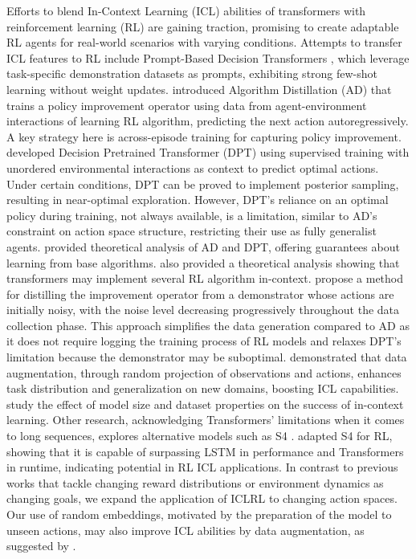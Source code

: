 \documentclass{article}
\theoremstyle{plain}
\theoremstyle{definition}
\theoremstyle{remark}
\begin{document}
Efforts to blend In-Context Learning (ICL) abilities of transformers with reinforcement learning (RL) are gaining traction, promising to create adaptable RL agents for real-world scenarios with varying conditions. Attempts to transfer ICL features to RL include Prompt-Based Decision Transformers \citep{xu2022prompting}, which leverage task-specific demonstration datasets as prompts, exhibiting strong few-shot learning without weight updates. \citet{laskin2022context} introduced Algorithm Distillation (AD) that trains a policy improvement operator using data from agent-environment interactions of learning RL algorithm, predicting the next action autoregressively. A key strategy here is across-episode training for capturing policy improvement. \citet{lee2023supervised} developed Decision Pretrained Transformer (DPT) using supervised training with unordered environmental interactions as context to predict optimal actions. Under certain conditions, DPT can be proved to implement posterior sampling, resulting in near-optimal exploration. However, DPT's reliance on an optimal policy during training, not always available, is a limitation, similar to AD's constraint on action space structure, restricting their use as fully generalist agents. \citet{lin2023transformers} provided theoretical analysis of AD and DPT, offering guarantees about learning from base algorithms. \citet{wang2024transformers} also provided a theoretical analysis showing that transformers may implement several RL algorithm in-context. \citet{zisman2023emergence} propose a method for distilling the improvement operator from a demonstrator whose actions are initially noisy, with the noise level decreasing progressively throughout the data collection phase. This approach simplifies the data generation compared to AD as it does not require logging the training process of RL models and relaxes DPT's limitation because the demonstrator may be suboptimal. \citet{kirsch2023towards} demonstrated that data augmentation, through random projection of observations and actions, enhances task distribution and generalization on new domains, boosting ICL capabilities. \citet{raparthy2023generalization} study the effect of model size and dataset properties on the success of in-context learning. Other research, acknowledging Transformers' limitations when it comes to long sequences, explores alternative models such as S4 \citep{gu2021efficiently}. \citet{lu2023structured} adapted S4 for RL, showing that it is capable of surpassing LSTM in performance and Transformers in runtime, indicating potential in RL ICL applications.
In contrast to previous works that tackle changing reward distributions or environment dynamics as changing goals, we expand the application of ICLRL to changing action spaces. Our use of random embeddings, motivated by the preparation of the model to unseen actions, may also improve ICL abilities by data augmentation, as suggested by \citet{kirsch2023towards}.
\end{document}
